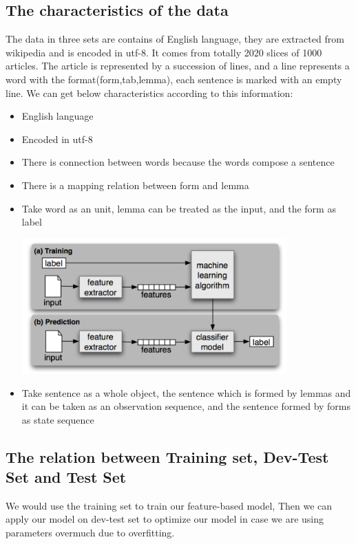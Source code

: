 \documentclass[a4paper]{article}
\begin{document}
\subsection{The characteristics of the data}
The data in three sets are contains of English language, they are extracted from wikipedia and is encoded in utf-8. It comes from totally 2020 slices of 1000 articles. The article is represented by a succession of lines, and a line represents a word with the format(form,tab,lemma), each sentence is marked with an empty line. We can get below characteristics according to this information:
\begin{itemize}
\item English language
\item Encoded in utf-8
\item There is connection between words because the words compose a sentence
\item There is a mapping relation between form and lemma
\item Take word as an unit, lemma can be treated as the input, and the form as label
\begin{center}
\includegraphics[width=0.8\textwidth]{process_flow.png}
\end{center}
\item Take sentence as a whole object, the sentence which is formed by lemmas and it can be taken as an observation sequence, and the sentence formed by forms as state sequence


\end{itemize}

\subsection{The relation between Training set, Dev-Test Set and Test Set}

We would use the training set to train our feature-based model, Then we can apply our model on dev-test set to optimize our model in case we are using  parameters overmuch due to overfitting.
\end{document}
